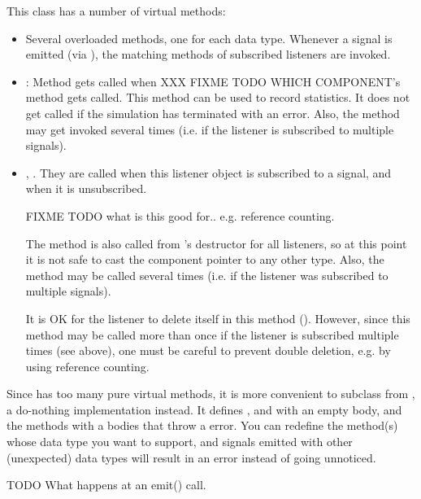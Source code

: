 \begin{note}
\begin{note}
This class has a number of virtual methods:

\begin{itemize}
  \item Several overloaded  methods, one for each
    data type. Whenever a signal is emitted (via ),
    the matching  methods of subscribed listeners
    are invoked.
  \item {}: Method gets called when XXX FIXME TODO WHICH COMPONENT's
     method gets called. This method can be used to record
    statistics. It does not get called if the simulation has terminated
    with an error. Also, the method may get invoked several times (i.e.
    if the listener is subscribed to multiple signals).
  \item {}, . They are called
    when this listener object is subscribed to a signal, and when it is
    unsubscribed.

    FIXME TODO what is this good for.. e.g. reference counting.

    The  method is also called from 's
    destructor for all listeners, so at this point it is not safe to cast the
    component pointer to any other type. Also, the method may be called several times
    (i.e. if the listener was subscribed to multiple signals).

    It is OK for the listener to delete itself in this method ().
    However, since this method may be called more than once if the listener
    is subscribed multiple times (see above), one must be careful to prevent
    double deletion, e.g. by using reference counting.

\end{itemize}

Since  has too many pure virtual methods, it is more
convenient to subclass from , a do-nothing implementation
instead. It defines ,  and
 with an empty body, and the 
methods with a bodies that throw a  error.
You can redefine the  method(s) whose data type
you want to support, and signals emitted with other (unexpected) data
types will result in an error instead of going unnoticed.

TODO What happens at an emit() call.


\end{note}
\end{note}
